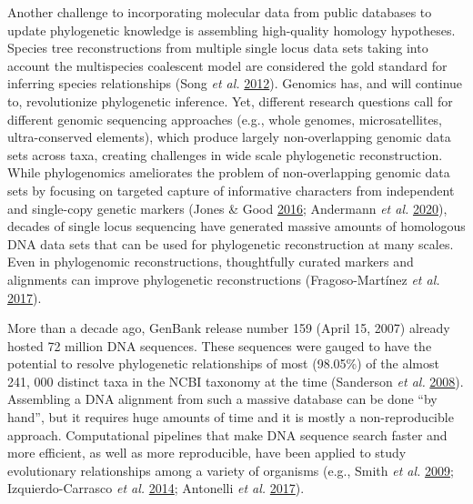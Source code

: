 \documentclass[]{article}
\begin{document}
Another challenge to incorporating molecular data from public databases to update phylogenetic knowledge is assembling high-quality homology hypotheses.
Species tree reconstructions from multiple single locus data sets taking into account the multispecies coalescent model are considered the gold standard for inferring species relationships (Song \emph{et al.} \protect\hyperlink{ref-song2012resolving}{2012}).
Genomics has, and will continue to, revolutionize phylogenetic inference.
Yet, different research questions call for different genomic sequencing approaches (e.g., whole genomes, microsatellites, ultra-conserved elements), which produce largely non-overlapping genomic data sets across taxa, creating challenges in wide scale phylogenetic reconstruction.
While phylogenomics ameliorates the problem of non-overlapping genomic data sets by focusing on targeted capture of informative characters from independent and single-copy genetic markers (Jones \& Good \protect\hyperlink{ref-jones2016targeted}{2016}; Andermann \emph{et al.} \protect\hyperlink{ref-andermann2020guide}{2020}), decades of single locus sequencing have generated massive amounts of homologous DNA data sets that can be used for phylogenetic reconstruction at many scales.
Even in phylogenomic reconstructions, thoughtfully curated markers and alignments can improve phylogenetic reconstructions (Fragoso-Martínez \emph{et al.} \protect\hyperlink{ref-fragoso2017pilot}{2017}).

More than a decade ago, GenBank release number 159 (April 15, 2007) already hosted 72 million DNA sequences. These sequences were gauged to have the potential to resolve phylogenetic relationships of most (98.05\%) of the almost 241, 000 distinct taxa in the NCBI taxonomy at the time (Sanderson \emph{et al.} \protect\hyperlink{ref-sanderson2008phylota}{2008}). Assembling a DNA alignment from such a massive database can be done ``by hand'', but it requires huge amounts of time and it is mostly a non-reproducible approach. Computational pipelines that make DNA sequence search faster and more efficient, as well as more reproducible, have been applied to study evolutionary relationships among a variety of organisms (e.g., Smith \emph{et al.} \protect\hyperlink{ref-smith2009mega}{2009}; Izquierdo-Carrasco \emph{et al.} \protect\hyperlink{ref-izquierdo2014pumper}{2014}; Antonelli \emph{et al.} \protect\hyperlink{ref-antonelli2017toward}{2017}).
\end{document}
